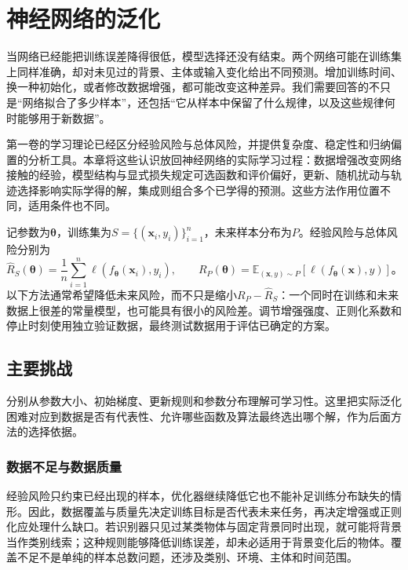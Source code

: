 \chapter{神经网络的泛化}
\label{chap:neural-network-generalization}

当网络已经能把训练误差降得很低，模型选择还没有结束。两个网络可能在训练集上同样准确，却对未见过的背景、主体或输入变化给出不同预测。增加训练时间、换一种初始化，或者修改数据增强，都可能改变这种差异。我们需要回答的不只是“网络拟合了多少样本”，还包括“它从样本中保留了什么规律，以及这些规律何时能够用于新数据”。

第一卷的学习理论已经区分经验风险与总体风险，并提供复杂度、稳定性和归纳偏置的分析工具。本章将这些认识放回神经网络的实际学习过程：数据增强改变网络接触的经验，模型结构与显式损失规定可选函数和评价偏好，更新、随机扰动与轨迹选择影响实际学得的解，集成则组合多个已学得的预测。这些方法作用位置不同，适用条件也不同。

记参数为$\bm\theta$，训练集为$S=\{(\bm x_i,y_i)\}_{i=1}^n$，未来样本分布为$P$。经验风险与总体风险分别为
\begin{equation}
  \hat R_S(\bm\theta)=\frac1n\sum_{i=1}^n
    \ell(f_{\bm\theta}(\bm x_i),y_i),\qquad
  R_P(\bm\theta)=\mathbb E_{(\bm x,y)\sim P}
    [\ell(f_{\bm\theta}(\bm x),y)]\text{。}
  \label{eq:generalization-risks}
\end{equation}
以下方法通常希望降低未来风险，而不只是缩小$R_P-\hat R_S$：一个同时在训练和未来数据上很差的常量模型，也可能具有很小的风险差。调节增强强度、正则化系数和停止时刻使用独立验证数据，最终测试数据用于评估已确定的方案。

\section{主要挑战}
\label{sec:generalization-challenges}

分别从参数大小、初始梯度、更新规则和参数分布理解可学习性。这里把实际泛化困难对应到数据是否有代表性、允许哪些函数及算法最终选出哪个解，作为后面方法的选择依据。

\subsection{数据不足与数据质量}
\label{sec:generalization-data-quality}

经验风险只约束已经出现的样本，优化器继续降低它也不能补足训练分布缺失的情形。因此，数据覆盖与质量先决定训练目标是否代表未来任务，再决定增强或正则化应处理什么缺口。若识别器只见过某类物体与固定背景同时出现，就可能将背景当作类别线索；这种规则能够降低训练误差，却未必适用于背景变化后的物体。覆盖不足不是单纯的样本总数问题，还涉及类别、环境、主体和时间范围。

